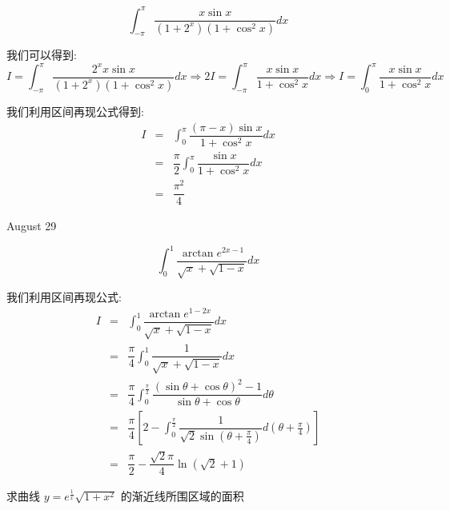 \begin{example}[][Exam: 34.4.14]
	$$\int_{-\pi}^{\pi}\dfrac{x\sin x}{(1+2^x)(1+\cos^2 x)}dx$$
\end{example}

\begin{solution}

	我们可以得到:  
	$$I=\int_{-\pi}^{\pi}\dfrac{2^xx\sin x}{(1+2^x)(1+\cos^2 x)}dx\Rightarrow 2I=\int_{-\pi}^{\pi}\dfrac{x\sin x}{1+\cos^2 x}dx\Rightarrow I=\int_{0}^{\pi}\dfrac{x\sin x}{1+\cos^2 x}dx$$
	
	我们利用区间再现公式得到:  
	\begin{eqnarray*}
		I&=&\int_{0}^{\pi}\dfrac{(\pi-x)\sin x}{1+\cos^2 x}dx\\
		&=&\dfrac{\pi}{2}\int_{0}^{\pi}\dfrac{\sin x}{1+\cos^2 x}dx\\
		&=&\dfrac{\pi^2}{4}
	\end{eqnarray*}
\end{solution}


\textcolor{purplea}{August 29}

\begin{example}[][Exam: 34.4.15]
	$$\int_{0}^{1}\dfrac{\arctan e^{2x-1}}{\sqrt{x}+\sqrt{1-x}}dx$$
\end{example}

\begin{solution}

	我们利用区间再现公式:  
	\begin{eqnarray*}
		I&=&\int_{0}^{1}\dfrac{\arctan e^{1-2x}}{\sqrt{x}+\sqrt{1-x}}dx\\
		&=&\dfrac{\pi}{4}\int_{0}^{1}\dfrac{1}{\sqrt{x}+\sqrt{1-x}}dx\\
		&=&\dfrac{\pi}{4}\int_{0}^{\frac{\pi}{2}}\dfrac{(\sin\theta+\cos\theta)^2-1}{\sin \theta+\cos\theta}d\theta\\
		&=&\dfrac{\pi}{4}\left[ 2-\int_{0}^{\frac{\pi}{2}}\dfrac{1}{\sqrt{2}\sin(\theta+\frac{\pi}{4})}d(\theta+\frac{\pi}{4})\right]\\
		&=&\dfrac{\pi}{2}-\dfrac{\sqrt{2}\pi}{4}\ln(\sqrt{2}+1) 
	\end{eqnarray*}
\end{solution}

\begin{example}[][Exam: 34.4.16]
	求曲线 $y=e^{\frac{1}{x}}\sqrt{1+x^2}$ 的渐近线所围区域的面积
\end{example}

